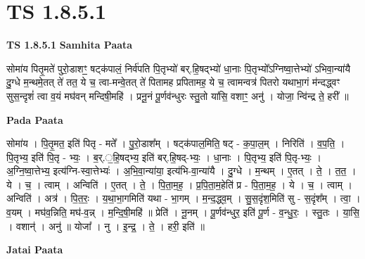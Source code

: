 \documentclass[17pt]{extarticle}
\begin{document}
\section{ TS 1.8.5.1 }

\textbf{TS 1.8.5.1 } \newline
\textbf{Samhita Paata} \newline

सोमा॑य पितृ॒मते॑ पुरो॒डाशꣳ॒॒ षट्क॑पालं॒ निर्व॑पति पि॒तृभ्यो॑ बर्.हि॒षद्भ्यो॑ धा॒नाः पि॒तृभ्यो᳚ऽग्निष्वा॒त्तेभ्यो॑ ऽभिवा॒न्या॑यै दु॒ग्धे म॒न्थमे॒तत् ते॑ तत॒ ये च॒ त्वा-मन्वे॒तत् ते॑ पितामह प्रपितामह॒ ये च॒ त्वामन्वत्र॑ पितरो यथाभा॒गं म॑न्दद्ध्वꣳ सुस॒न्दृशं॑ त्वा व॒यं मघ॑वन् मन्दिषी॒महि॑ । प्रनू॒नं पू॒र्णव॑न्धुरः स्तु॒तो या॑सि॒ वशाꣳ॒॒ अनु॑ । योजा॒ न्वि॑न्द्र ते॒ हरी᳚ ॥ \newline

\textbf{Pada Paata} \newline

सोमा॑य । पि॒तृ॒मत॒ इति॑ पितृ - मते᳚ । पु॒रो॒डाश᳚म् । षट्क॑पाल॒मिति॒ षट् - क॒पा॒ल॒म् । निरिति॑ । व॒प॒ति॒ । पि॒तृभ्य॒ इति॑ पि॒तृ - भ्यः॒ । ब॒र्.॒हि॒षद्भ्य॒ इति॑ बर्.हि॒षद्-भ्यः॒ । धा॒नाः । पि॒तृभ्य॒ इति॑ पि॒तृ-भ्यः॒ । अ॒ग्नि॒ष्वा॒त्तेभ्य॒ इत्य॑ग्नि-स्वा॒त्तेभ्यः॑ । अ॒भि॒वा॒न्या॑या॒ इत्य॑भि-वा॒न्या॑यै । दु॒ग्धे । म॒न्थम् । ए॒तत् । ते॒ । त॒त॒ । ये । च॒ । त्वाम् । अन्विति॑ । ए॒तत् । ते॒ । पि॒ता॒म॒ह॒ । प्र॒पि॒ता॒म॒हेति॑ प्र - पि॒ता॒म॒ह॒ । ये । च॒ । त्वाम् । अन्विति॑ । अत्र॑ । पि॒त॒रः॒ । य॒था॒भा॒गमिति॑ यथा - भा॒गम् । म॒न्द॒द्ध्व॒म् । सु॒स॒दृंश॒मिति॑ सु - स॒दृंश᳚म् । त्वा॒ । व॒यम् । मघ॑व॒न्निति॒ मघ॑-व॒न्न् । म॒न्दि॒षी॒महि॑ ॥ प्रेति॑ । नू॒नम् । पू॒र्णव॑न्धुर॒ इति॑ पू॒र्ण - व॒न्धु॒रः॒ । स्तु॒तः । या॒सि॒ । वशान्॑ । अनु॑ ॥ योजा᳚ । नु । इ॒न्द्र॒ । ते॒ । हरी॒ इति॑ ॥  \newline



\textbf{Jatai Paata} \newline
\end{document}
